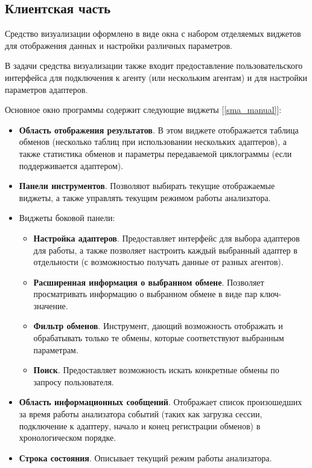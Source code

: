 \subsection{Клиентская часть}

Средство визуализации оформлено в виде окна с набором отделяемых виджетов для отображения данных и настройки различных параметров. 

В задачи средства визуализации также входит предоставление пользовательского интерфейса для подключения к агенту (или нескольким агентам) и для настройки параметров адаптеров.

Основное окно программы содержит следующие виджеты [\ref{sma_manual}]:

\begin{itemize}
 \item \textbf{Область отображения результатов}. В этом виджете отображается таблица обменов (несколько таблиц при использовании нескольких адаптеров), а также статистика обменов и параметры передаваемой циклограммы (если поддерживается адаптером).
 \item \textbf{Панели инструментов}. Позволяют выбирать текущие отображаемые виджеты, а также управлять текущим режимом работы анализатора.
 \item Виджеты боковой панели:
 \begin{itemize}
  \item \textbf{Настройка адаптеров}. Предоставляет интерфейс для выбора адаптеров для работы, а также позволяет настроить каждый выбранный адаптер в отдельности (с возможностью получать данные от разных агентов).
  \item \textbf{Расширенная информация о выбранном обмене}. Позволяет просматривать информацию о выбранном обмене в виде пар ключ-значение.
  \item \textbf{Фильтр обменов}. Инструмент, дающий возможность отображать и обрабатывать только те обмены, которые соответствуют выбранным параметрам.
  \item \textbf{Поиск}. Предоставляет возможность искать конкретные обмены по запросу пользователя.
 \end{itemize}
 \item \textbf{Область информационных сообщений}. Отображает список произошедших за время работы анализатора событий (таких как загрузка сессии, подключение к адаптеру, начало и конец регистрации обменов) в хронологическом порядке.
 \item \textbf{Строка состояния}. Описывает текущий режим работы анализатора.
\end{itemize}

